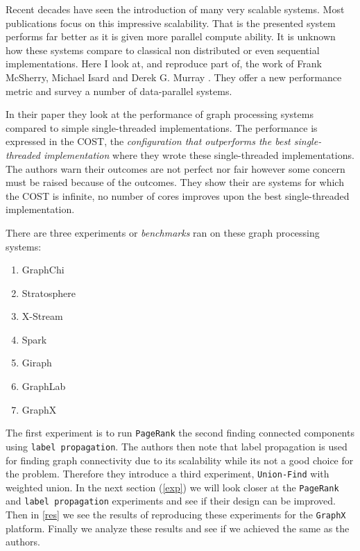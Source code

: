 Recent decades have seen the introduction of many very scalable systems. Most publications focus on this impressive scalability. That is the presented system performs far better as it is given more parallel compute ability. It is unknown how these systems compare to classical non distributed or even sequential implementations. Here I look at, and reproduce part of, the work of Frank McSherry, Michael Isard and Derek G. Murray \cite{189908}. They offer a new performance metric and survey a number of data-parallel systems.

In their paper they look at the performance of graph processing systems compared to simple single-threaded implementations. The performance is expressed in the COST, the \textit{configuration that outperforms the best single-threaded implementation} where they wrote these single-threaded implementations. The authors warn their outcomes are not perfect nor fair however some concern must be raised because of the outcomes. They show their are systems for which the COST is infinite, no number of cores improves upon the best single-threaded implementation.

There are three experiments or \textit{benchmarks} ran on these graph processing systems:

\begin{multicols}{2}
\begin{enumerate}
	\item GraphChi 
	\item Stratosphere
	\item X-Stream
	\item Spark
	\item Giraph
	\item GraphLab
	\item GraphX
\end{enumerate}
\end{multicols}

The first experiment is to run \texttt{PageRank} the second finding connected components using \texttt{label propagation}. The authors then note that label propagation is used for finding graph connectivity due to its scalability while its not a good choice for the problem. Therefore they introduce a third experiment, \texttt{Union-Find} with weighted union. In the next section (\cref{exp}) we will look closer at the \texttt{PageRank} and \texttt{label propagation} experiments and see if their design can be improved. Then in \cref{res} we see the results of reproducing these experiments for the \texttt{GraphX} platform. Finally we analyze these results and see if we achieved the same as the authors.
